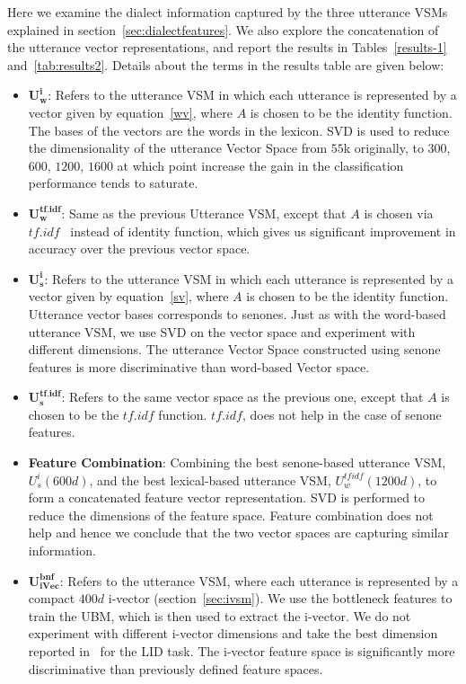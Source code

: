 \documentclass{article}
\begin{document}
Here we examine the dialect information captured by the three utterance VSMs explained in section~\ref{sec:dialectfeatures}. We also explore the concatenation of the utterance vector representations, and report the results in Tables~\ref{results-1} and~\ref{tab:results2}. Details about the terms in the results table are given below:
\begin{itemize}
  \itemsep0em
  \item $\mathbf{U_{w}^{i}}$: Refers to the utterance VSM in which each utterance is represented by a vector given by equation~\ref{wv}, where $A$ is chosen to be the identity function. The bases of the vectors are the words in the lexicon. SVD is used to reduce the dimensionality of the utterance Vector Space from $55$k originally, to $300$, $600$, $1200$, $1600$ at which point increase the gain in the classification performance tends to saturate.
  \item $\mathbf{U_{w}^{tf.idf}}$: Same as the previous Utterance VSM, except that $A$ is chosen via $tf.idf$~\cite{Ramos} instead of identity function, which gives us significant improvement in accuracy over the previous vector space.
  \item $\mathbf{U_{s}^{i}}$: Refers to the utterance VSM in which each utterance is represented by a vector given by equation~\ref{sv}, where $A$ is chosen to be the identity function. Utterance vector bases corresponds to senones. Just as with the word-based utterance VSM, we use SVD on the vector space and experiment with different dimensions. The utterance Vector Space constructed using senone features is more discriminative than word-based Vector space.
  \item $\mathbf{U_{s}^{tf.idf}}$: Refers to the same vector space as the previous one, except that $A$ is chosen to be the $tf.idf$ function. $tf.idf$, does not help in the case of senone features.
  \item \textbf{Feature Combination}: Combining the best senone-based utterance VSM, $U_{s}^{i}(600d)$, and the best lexical-based utterance VSM, $U_{w}^{tfidf}(1200d)$, to form a concatenated feature vector representation. SVD is performed to reduce the dimensions of the feature space. Feature combination does not help and hence we conclude that the two vector spaces are capturing similar information.
  \item $\mathbf{U_{iVec}^{bnf}}$: Refers to the utterance VSM, where each utterance is represented by a compact $400d$ i-vector (section~\ref{sec:ivsm}). We use the bottleneck features to train the UBM, which is then used to extract the i-vector. We do not experiment with different i-vector dimensions and take the best dimension reported in~\cite{dehak2011language} for the LID task. The i-vector feature space is significantly more discriminative than previously defined feature spaces.

\end{itemize}
\end{document}
